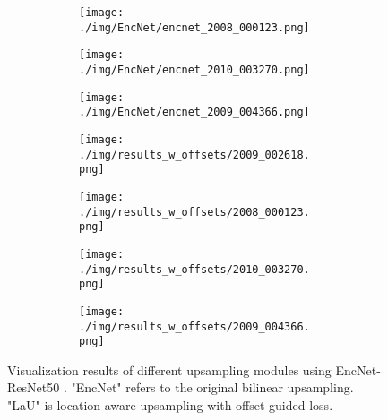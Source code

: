 \documentclass[10pt,twocolumn,letterpaper]{article}
\begin{document}
\begin{figure}
\begin{subfigure}[t]{0.11\textwidth}
        \begin{subfigure}[t]{\textwidth}
                \texttt{[image: ./img/EncNet/encnet\_2008\_000123.png]}
            \end{subfigure}\vspace{.6ex}

        \begin{subfigure}[t]{\textwidth}
                \texttt{[image: ./img/EncNet/encnet\_2010\_003270.png]}
            \end{subfigure}\vspace{.6ex}

            \begin{subfigure}[t]{\textwidth}
                \texttt{[image: ./img/EncNet/encnet\_2009\_004366.png]}
            \captionsetup{justification=centering}
        \label{7c}
            \end{subfigure}
    \end{subfigure}
\begin{subfigure}[t]{0.11\textwidth}
        \begin{subfigure}[t]{\textwidth}
                \texttt{[image: ./img/results\_w\_offsets/2009\_002618.png]}
            \end{subfigure}\vspace{.6ex}

        \begin{subfigure}[t]{\textwidth}
                \texttt{[image: ./img/results\_w\_offsets/2008\_000123.png]}
            \end{subfigure}\vspace{.6ex}

        \begin{subfigure}[t]{\textwidth}
                \texttt{[image: ./img/results\_w\_offsets/2010\_003270.png]}
            \end{subfigure}\vspace{.6ex}

            \begin{subfigure}[t]{\textwidth}
                \texttt{[image: ./img/results\_w\_offsets/2009\_004366.png]}
        \label{7d}
            \end{subfigure}
    \end{subfigure}
        \caption{Visualization results of different upsampling modules using EncNet-ResNet50 \cite{EncNet}. "EncNet" refers to the original bilinear upsampling. "LaU" is  location-aware upsampling with offset-guided loss.}
\label{view}
\end{figure}
\end{document}
